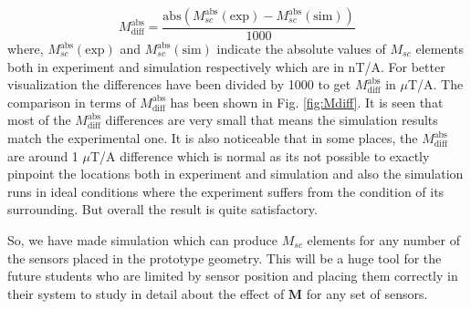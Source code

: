 \begin{equation}
    M_{\text{diff}}^{\text{abs}}=\frac{\text{abs}(M_{sc}^{\text{abs}}(\text{exp})-M_{sc}^{\text{abs}}(\text{sim}))}{1000}
\end{equation}
where, $M_{sc}^{\text{abs}}(\text{exp})$ and $M_{sc}^{\text{abs}}(\text{sim})$ indicate the absolute values of $M_{sc}$ elements both in experiment and simulation respectively which are in nT/A. For better visualization the differences have been divided by 1000 to get $M_{\text{diff}}^{\text{abs}}$ in $\mu$T/A. 
The comparison in terms of $M_{\text{diff}}^{\text{abs}}$ has been shown in Fig. \ref{fig:Mdiff}. It is seen that most of the $M_{\text{diff}}^{\text{abs}}$ differences are very small that means the simulation results match the experimental one. It is also noticeable that in some places, the $M_{\text{diff}}^{\text{abs}}$ are around 1 $\mu$T/A difference which is normal as its not possible to exactly pinpoint the locations both in experiment and simulation and also the simulation runs in ideal conditions where the experiment suffers from the condition of its surrounding. But overall the result is quite satisfactory.


\FloatBarrier
So, we have made simulation which can produce $M_{sc}$ elements for any number of the sensors placed in the prototype geometry. This will be a huge tool for the future students who are limited by sensor position and placing them correctly in their system to study in detail about the effect of $\bm{M}$ for any set of sensors.


